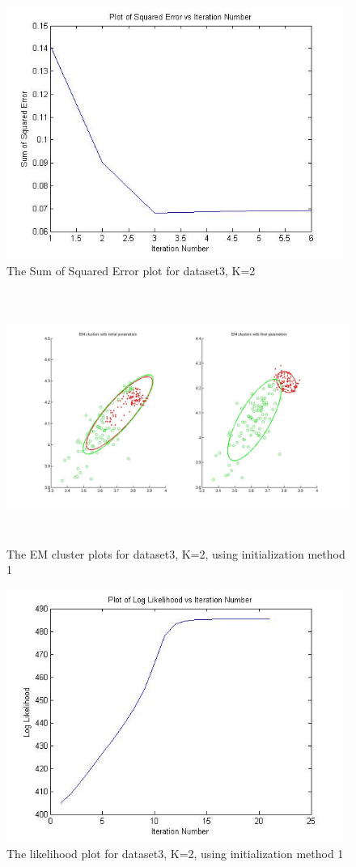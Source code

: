 \documentclass[11pt,psfig]{article}
\begin{document}
\begin{figure}[H]
\centering
\includegraphics[height=3.25in]{dataset3_kMeans_squaredErrorPlot.jpg}
\caption{The Sum of Squared Error plot for dataset3, K=2}
\end{figure}

\begin{figure}[H]
\centering
\includegraphics[height=3.25in]{dataset3_EMclusterPlots.jpg}
\caption{The EM cluster plots for dataset3, K=2, using initialization method 1}
\end{figure}

\begin{figure}[H]
\centering
\includegraphics[height=3.25in]{dataset3_EMlogLikelihoodPlot.jpg}
\caption{The likelihood plot for dataset3, K=2, using initialization method 1}
\end{figure}
\end{document}
